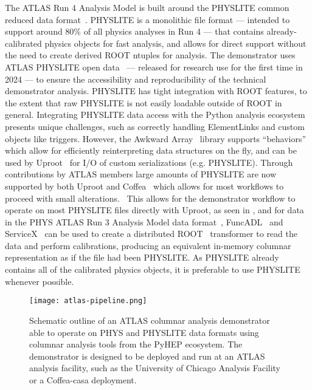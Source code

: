 The ATLAS Run 4 Analysis Model is built around the PHYSLITE common reduced data format~\cite{Schaarschmidt:2024vzr,SOFT-2022-02}.
PHYSLITE is a monolithic file format --- intended to support around 80\% of all physics analyses in Run 4 --- that contains already-calibrated physics objects for fast analysis, and allows for direct support without the need to create derived ROOT ntuples for analysis.
The demonstrator uses ATLAS PHYSLITE open data~\cite{ATL-OREACH-PROC-2024-005} --- released for research use for the first time in 2024 --- to ensure the accessibility and reproducibility of the technical demonstrator analysis.
PHYSLITE has tight integration with ROOT features, to the extent that raw PHYSLITE is not easily loadable outside of ROOT in general.
Integrating PHYSLITE data access with the Python analysis ecosystem presents unique challenges, such as correctly handling ElementLinks and custom objects like triggers.
However, the Awkward Array~\cite{Awkward_Array_2018} library supports ``behaviors'' which allow for efficiently reinterpreting data structures on the fly, and can be used by Uproot~\cite{Uproot_2017} for I/O of custom serializations (e.g. PHYSLITE).
Through contributions by ATLAS members large amounts of PHYSLITE are now supported by both Uproot and Coffea~\cite{Coffea_2023,CMS:2020kpn} which allows for most workflows to proceed with small alterations.~\cite{US_ATLAS_IRISHEP_trainging:2024}
This allows for the demonstrator workflow to operate on most PHYSLITE files directly with Uproot, as seen in , and for data in the PHYS ATLAS Run 3 Analysis Model data format~\cite{SOFT-2022-02}, FuncADL~\cite{funcadl_2024,Proffitt:2021wfh} and ServiceX~\cite{serviceX_2024,serviceX_client_2024,Galewsky:2020xig} can be used to create a distributed ROOT~\cite{Brun:1997pa} transformer to read the data and perform calibrations, producing an equivalent in-memory columnar representation as if the file had been PHYSLITE.
As PHYSLITE already contains all of the calibrated physics objects, it is preferable to use PHYSLITE whenever possible.

\begin{figure}
    \centering
    \texttt{[image: atlas-pipeline.png]}
    \caption{Schematic outline of an ATLAS columnar analysis demonstrator able to operate on PHYS and PHYSLITE data formats using columnar analysis tools from the PyHEP ecosystem.
    The demonstrator is designed to be deployed and run at an ATLAS analysis facility, such as the University of Chicago Analysis Facility or a Coffea-casa deployment.}
    \label{fig:atlas-pipeline}
\end{figure}

